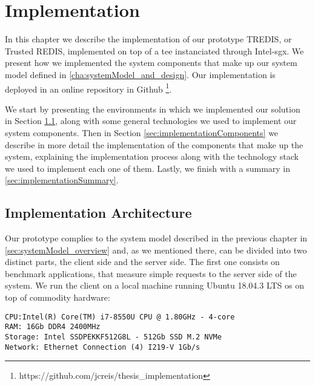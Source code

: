 \chapter{Implementation}
\label{cha:implementation}

In this chapter we describe the implementation of our prototype TREDIS, or Trusted REDIS, implemented on top of a \gls{tee} instanciated through Intel-\gls{sgx}. 
We present how we implemented the system components that make up our system model defined in \ref{cha:systemModel_and_design}.
Our implementation is deployed in an online repository in Github \footnote{https://github.com/jcreis/thesis\_implementation}.

We start by presenting the environments in which we implemented our solution in Section \ref{sec:implementationArchitecture}, along with some general technologies we used to implement our system components. Then in Section \ref{sec:implementationComponents} we describe in more detail the implementation of the components that make up the system, explaining the implementation process along with the technology stack we used to implement each one of them. Lastly, we finish with a summary in \ref{sec:implementationSummary}.


\section{Implementation Architecture}
\label{sec:implementationArchitecture}

Our prototype complies to the system model described in the previous chapter in \ref{sec:systemModel_overview} and, as we mentioned there, can be divided into two distinct parts, the client side and the server side.
The first one consists on benchmark applications, that measure simple requests to the server side of the system. We run the client on a local machine running Ubuntu 18.04.3 LTS \gls{os} on top of commodity hardware:
\vspace{5mm}
\begin{lstlisting}
CPU:Intel(R) Core(TM) i7-8550U CPU @ 1.80GHz - 4-core
RAM: 16Gb DDR4 2400MHz
Storage: Intel SSDPEKKF512G8L - 512Gb SSD M.2 NVMe
Network: Ethernet Connection (4) I219-V 1Gb/s
\end{lstlisting} 
\vspace{3mm}

